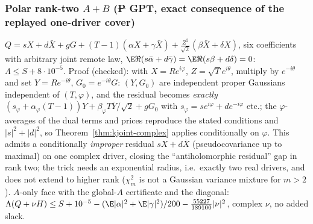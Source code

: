 \subsubsection{Polar rank-two $A{+}B$ (\st{P} GPT, exact consequence of the replayed one-driver cover)}\label{sec:knext-polar}
$Q=sX+d\bar X+gG+(T-1)(\alpha X+\gamma\bar X)+\frac{Z^2}{\sqrt2}(\beta\bar X+\delta X)$, six coefficients with arbitrary joint remote law, $\E\Re(s\bar\alpha+d\bar\gamma)=\E\Re(s\beta+d\delta)=0$:
$\Lambda\le S+8\cdot10^{-5}$. Proof (checked): with $X=Re^{i\varphi}$, $Z=\sqrt Te^{i\theta}$, multiply by $e^{-i\theta}$ and set $Y=Re^{-i\theta}$, $G_0=e^{-i\theta}G$: $(Y,G_0)$ are independent
proper Gaussians independent of $(T,\varphi)$, and the residual becomes \emph{exactly} $(s_\varphi+\alpha_\varphi(T-1))Y+\beta_\varphi T\bar Y/\sqrt2+gG_0$ with $s_\varphi=se^{i\varphi}+de^{-i\varphi}$ etc.;
the $\varphi$-averages of the dual terms and prices reproduce the stated conditions and $|s|^2+|d|^2$, so Theorem~\ref{thm:kjoint-complex} applies conditionally on $\varphi$. This admits a
conditionally \emph{improper} residual $sX+d\bar X$ (pseudocovariance up to maximal) on one complex driver, closing the ``antiholomorphic residual'' gap in rank two; the trick needs an
exponential radius, i.e.\ exactly two real drivers, and does not extend to higher rank ($\chi^2_m$ is not a Gaussian variance mixture for $m>2$). $A$-only face with the global-$A$ certificate
and the diagonal: $\Lambda(Q+\nu H)\le S+10^{-5}-(\E|\alpha|^2+\E|\gamma|^2)/200-\frac{55227}{189100}|\nu|^2$, complex $\nu$, no added slack.

